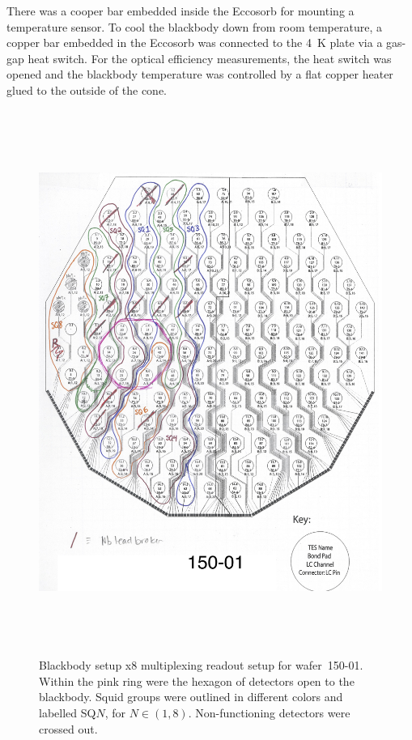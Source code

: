 There was a cooper bar embedded inside the Eccosorb for mounting a temperature sensor. %
To cool the blackbody down from room temperature, a copper bar embedded in the Eccosorb was connected to the 4~K plate via a gas-gap heat switch.
For the optical efficiency measurements, the heat switch was opened and the blackbody temperature was controlled by a flat copper heater glued to the outside of the cone.


\begin{figure}[htp]
\begin{center}
\includegraphics[height=7in]{figures/EBEX_Nb01_150GHz_wafer_schem.png}
\caption{Blackbody setup x8 multiplexing readout setup for wafer~150-01. Within the pink ring were the hexagon of detectors open to the blackbody. Squid groups were outlined in different colors and labelled SQ$N$, for $N \in (1,8)$. Non-functioning detectors were crossed out. 
\label{fig:bb_wafer_layout} }
\end{center}
\end{figure}


